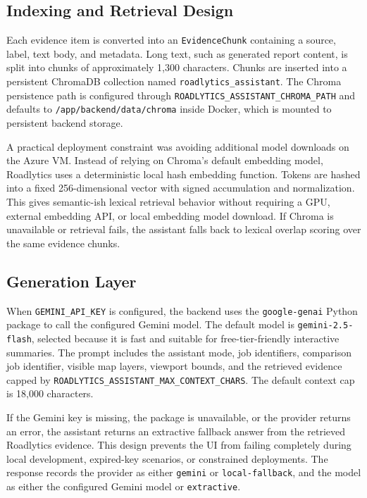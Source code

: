 ﻿\documentclass[conference]{IEEEtran}
\begin{document}
\subsection{Indexing and Retrieval Design}
Each evidence item is converted into an \texttt{EvidenceChunk} containing a source, label, text body, and metadata. Long text, such as generated report content, is split into chunks of approximately 1,300 characters. Chunks are inserted into a persistent ChromaDB collection named \texttt{roadlytics\_assistant}. The Chroma persistence path is configured through \texttt{ROADLYTICS\_ASSISTANT\_CHROMA\_PATH} and defaults to \texttt{/app/backend/data/chroma} inside Docker, which is mounted to persistent backend storage.

A practical deployment constraint was avoiding additional model downloads on the Azure VM. Instead of relying on Chroma's default embedding model, Roadlytics uses a deterministic local hash embedding function. Tokens are hashed into a fixed 256-dimensional vector with signed accumulation and normalization. This gives semantic-ish lexical retrieval behavior without requiring a GPU, external embedding API, or local embedding model download. If Chroma is unavailable or retrieval fails, the assistant falls back to lexical overlap scoring over the same evidence chunks.

\subsection{Generation Layer}
When \texttt{GEMINI\_API\_KEY} is configured, the backend uses the \texttt{google-genai} Python package to call the configured Gemini model. The default model is \texttt{gemini-2.5-flash}, selected because it is fast and suitable for free-tier-friendly interactive summaries. The prompt includes the assistant mode, job identifiers, comparison job identifier, visible map layers, viewport bounds, and the retrieved evidence capped by \texttt{ROADLYTICS\_ASSISTANT\_MAX\_CONTEXT\_CHARS}. The default context cap is 18,000 characters.

If the Gemini key is missing, the package is unavailable, or the provider returns an error, the assistant returns an extractive fallback answer from the retrieved Roadlytics evidence. This design prevents the UI from failing completely during local development, expired-key scenarios, or constrained deployments. The response records the provider as either \texttt{gemini} or \texttt{local-fallback}, and the model as either the configured Gemini model or \texttt{extractive}.
\end{document}
